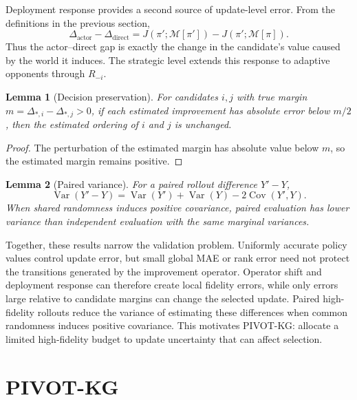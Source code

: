 \documentclass{article}
\newcommand{\M}{\mathcal{M}}
\newcommand{\pii}{\pi}
\newcommand{\pip}{\pi'}
\newtheorem{lemma}{Lemma}
\begin{document}
Deployment response provides a second source of update-level error. From the
definitions in the previous section,
\begin{equation}
 \Delta_{\mathrm{actor}}-\Delta_{\mathrm{direct}}
 =
 J(\pip;\M[\pip])-J(\pip;\M[\pii]).
\end{equation}
Thus the actor--direct gap is exactly the change in the candidate's value
caused by the world it induces. The strategic level extends this response to
adaptive opponents through $R_{-i}$.

\begin{lemma}[Decision preservation]\label{lem:decision-preservation}
For candidates $i,j$ with true margin
$m=\Delta_{*,i}-\Delta_{*,j}>0$, if each estimated improvement has absolute
error below $m/2$, then the estimated ordering of $i$ and $j$ is unchanged.
\end{lemma}
\begin{proof}
The perturbation of the estimated margin has absolute value below $m$, so the
estimated margin remains positive.
\end{proof}

\begin{lemma}[Paired variance]
For a paired rollout difference $Y'-Y$,
\begin{equation}
  \operatorname{Var}(Y'-Y)
  =
  \operatorname{Var}(Y')
  +\operatorname{Var}(Y)
  -2\operatorname{Cov}(Y',Y).
\end{equation}
When shared randomness induces positive covariance, paired evaluation has
lower variance than independent evaluation with the same marginal variances.
\end{lemma}

Together, these results narrow the validation problem. Uniformly accurate
policy values control update error, but small global MAE or rank error need
not protect the transitions generated by the improvement operator. Operator
shift and deployment response can therefore create local fidelity errors,
while only errors large relative to candidate margins can change the selected
update. Paired high-fidelity rollouts reduce the variance of estimating these
differences when common randomness induces positive covariance. This motivates
PIVOT-KG: allocate a limited high-fidelity budget to update uncertainty that
can affect selection.

\section{PIVOT-KG}
\end{document}
